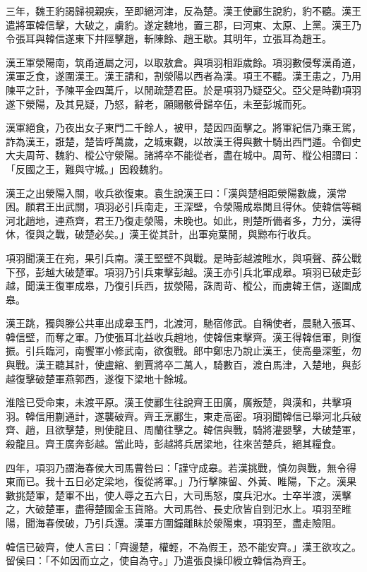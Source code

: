 \begin{pinyinscope}
三年，魏王豹謁歸視親疾，至即絕河津，反為楚。漢王使酈生說豹，豹不聽。漢王遣將軍韓信擊，大破之，虜豹。遂定魏地，置三郡，曰河東、太原、上黨。漢王乃令張耳與韓信遂東下井陘擊趙，斬陳餘、趙王歇。其明年，立張耳為趙王。

漢王軍滎陽南，筑甬道屬之河，以取敖倉。與項羽相距歲餘。項羽數侵奪漢甬道，漢軍乏食，遂圍漢王。漢王請和，割滎陽以西者為漢。項王不聽。漢王患之，乃用陳平之計，予陳平金四萬斤，以閒疏楚君臣。於是項羽乃疑亞父。亞父是時勸項羽遂下滎陽，及其見疑，乃怒，辭老，願賜骸骨歸卒伍，未至彭城而死。

漢軍絕食，乃夜出女子東門二千餘人，被甲，楚因四面擊之。將軍紀信乃乘王駕，詐為漢王，誑楚，楚皆呼萬歲，之城東觀，以故漢王得與數十騎出西門遁。令御史大夫周苛、魏豹、樅公守滎陽。諸將卒不能從者，盡在城中。周苛、樅公相謂曰：「反國之王，難與守城。」因殺魏豹。

漢王之出滎陽入關，收兵欲復東。袁生說漢王曰：「漢與楚相距滎陽數歲，漢常困。願君王出武關，項羽必引兵南走，王深壁，令滎陽成皋閒且得休。使韓信等輯河北趙地，連燕齊，君王乃復走滎陽，未晚也。如此，則楚所備者多，力分，漢得休，復與之戰，破楚必矣。」漢王從其計，出軍宛葉閒，與黥布行收兵。

項羽聞漢王在宛，果引兵南。漢王堅壁不與戰。是時彭越渡睢水，與項聲、薛公戰下邳，彭越大破楚軍。項羽乃引兵東擊彭越。漢王亦引兵北軍成皋。項羽已破走彭越，聞漢王復軍成皋，乃復引兵西，拔滎陽，誅周苛、樅公，而虜韓王信，遂圍成皋。

漢王跳，獨與滕公共車出成皋玉門，北渡河，馳宿修武。自稱使者，晨馳入張耳、韓信壁，而奪之軍。乃使張耳北益收兵趙地，使韓信東擊齊。漢王得韓信軍，則復振。引兵臨河，南饗軍小修武南，欲復戰。郎中鄭忠乃說止漢王，使高壘深塹，勿與戰。漢王聽其計，使盧綰、劉賈將卒二萬人，騎數百，渡白馬津，入楚地，與彭越復擊破楚軍燕郭西，遂復下梁地十餘城。

淮陰已受命東，未渡平原。漢王使酈生往說齊王田廣，廣叛楚，與漢和，共擊項羽。韓信用蒯通計，遂襲破齊。齊王烹酈生，東走高密。項羽聞韓信已舉河北兵破齊、趙，且欲擊楚，則使龍且、周蘭往擊之。韓信與戰，騎將灌嬰擊，大破楚軍，殺龍且。齊王廣奔彭越。當此時，彭越將兵居梁地，往來苦楚兵，絕其糧食。

四年，項羽乃謂海春侯大司馬曹咎曰：「謹守成皋。若漢挑戰，慎勿與戰，無令得東而已。我十五日必定梁地，復從將軍。」乃行擊陳留、外黃、睢陽，下之。漢果數挑楚軍，楚軍不出，使人辱之五六日，大司馬怒，度兵汜水。士卒半渡，漢擊之，大破楚軍，盡得楚國金玉貨賂。大司馬咎、長史欣皆自剄汜水上。項羽至睢陽，聞海春侯破，乃引兵還。漢軍方圍鐘離眛於滎陽東，項羽至，盡走險阻。

韓信已破齊，使人言曰：「齊邊楚，權輕，不為假王，恐不能安齊。」漢王欲攻之。留侯曰：「不如因而立之，使自為守。」乃遣張良操印綬立韓信為齊王。


\end{pinyinscope}
